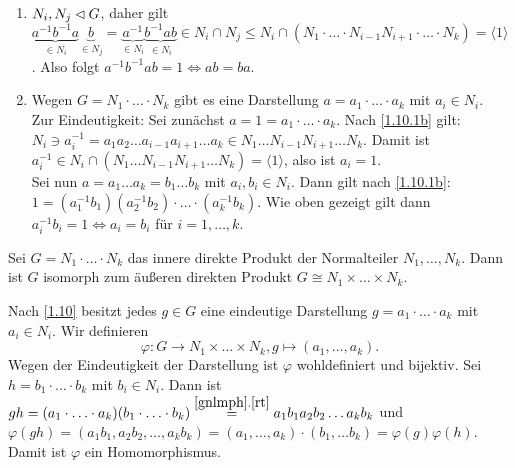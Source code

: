 \begin{beweis}\spspace
 \begin{enumerate}
  \item \label{schnaps}\label{1.10.1b} $N_i, N_j \lhd G$, daher gilt $\underbrace{a^{-1}b^{-1}a}_{\in N_i}\underbrace{b}_{\in N_j}=\underbrace{a^{-1}}_{\in N_i}\underbrace{b^{-1}ab}_{\in N_i} \in N_i\cap N_j \leq N_i\cap (N_1\cdot \ldots \cdot N_{i-1}N_{i+1}\cdot\ldots\cdot N_k) = \langle 1 \rangle$. Also folgt $a^{-1}b^{-1}ab=1 \Longleftrightarrow ab=ba$.

  \item Wegen $G=N_1\cdot\ldots\cdot N_k$ gibt es eine Darstellung $a=a_1\cdot\ldots\cdot a_k$ mit $a_i\in N_i$.\\Zur Eindeutigkeit: Sei zun\"achst $a=1=a_1\cdot\ldots\cdot a_k$. Nach \ref{1.10.1b} gilt: $ N_i \ni a_i^{-1}=a_1a_2\ldots a_{i-1}a_{i+1}\ldots a_k \in N_1\ldots N_{i-1}N_{i+1}\ldots N_k$. Damit ist $a_i^{-1}\in N_i \cap (N_1\ldots N_{i-1}N_{i+1}\ldots N_k) = \langle1\rangle$, also ist $a_i = 1$.\\
  Sei nun $a=a_1\ldots a_k=b_1\ldots b_k$ mit $a_i, b_i \in N_i$. Dann gilt nach \ref{1.10.1b}: $1=(a_1^{-1}b_1)(a_2^{-1}b_2)\cdot\ldots\cdot (a_k^{-1}b_k)$. Wie oben gezeigt gilt dann $a_i^{-1}b_i=1 \Longleftrightarrow a_i=b_i$ f\"ur $i=1,\ldots,k$.
 \end{enumerate}

\end{beweis}

\begin{satz} \label{hase}\label{1.11}
 Sei $G=N_1\cdot\ldots\cdot N_k$ das innere direkte Produkt der Normalteiler $N_1,\ldots, N_k$. Dann ist $G$ isomorph zum \"au\ss{}eren direkten Produkt $G \cong N_1 \times \ldots \times N_k$. 
\end{satz}

\begin{beweis}
 Nach \ref{1.10} besitzt jedes $g\in G$ eine eindeutige Darstellung $g=a_1\cdot\ldots\cdot a_k$ mit $a_i \in N_i$. Wir definieren $$\varphi:G\to N_1\times \ldots \times N_k, g \longmapsto (a_1,\ldots, a_k).$$ Wegen der Eindeutigkeit der Darstellung ist $\varphi$ wohldefiniert und bijektiv. Sei $h=b_1\cdot\ldots\cdot b_k$ mit $b_i\in N_i$. Dann ist $gh=(a_1\cdot\ldots\cdot a_k)(b_1\cdot\ldots\cdot b_k)\stackrel{\ref{gnlmph}.\ref{rt}}{=}a_1b_1a_2b_2\ldots a_kb_k$ und $\varphi(gh)=(a_1b_1, a_2b_2,\ldots, a_kb_k)=(a_1, \ldots, a_k)\cdot (b_1, \ldots b_k)= \varphi(g)\varphi(h)$. Damit ist $\varphi$ ein Homomorphismus.
\end{beweis}

